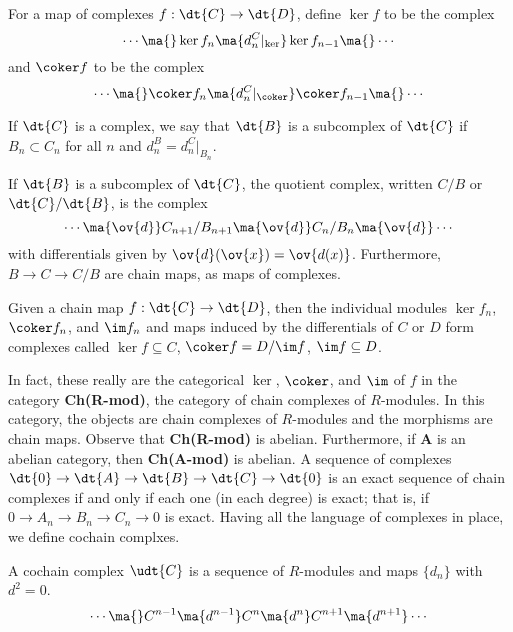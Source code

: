 \begin{dfn}
For a map of complexes $f: \dt{C} \to \dt{D}$, define $\ker f$ to be the complex
	\[
	\cdots \ma{} \ker f_n \ma{d_n^C |_{\ker}} \ker f_{n-1} \ma{} \cdots
	\]
and $\coker f$ to be the complex
	\[
	\cdots \ma{} \coker f_n \ma{d_n^C |_{\coker}} \coker f_{n-1} \ma{} \cdots
	\]
\end{dfn}


\begin{dfn}[Subcomplex]
If $\dt{C}$ is a complex, we say that $\dt{B}$ is a subcomplex of $\dt{C}$ if $B_n \subset C_n$ for all $n$ and $d_n^B=d_n^C |_{B_n}$.
\end{dfn}


\begin{dfn}
If $\dt{B}$ is a subcomplex of $\dt{C}$, the quotient complex, written $C/B$ or $\dt{C}/\dt{B}$, is the complex
	\[
	\cdots \ma{\ov{d}} C_{n+1}/B_{n+1} \ma{\ov{d}} C_n/B_n \ma{\ov{d}} \cdots
	\] 
with differentials given by $\ov{d}(\ov{x})=\ov{d(x)}$. Furthermore, $B \to C \to C/B$ are chain maps, as maps of complexes. 
\end{dfn}


\begin{dfn}
Given a chain map $f: \dt{C} \to \dt{D}$, then the individual modules $\ker f_n$, $\coker f_n$, and $\im f_n$ and maps induced by the differentials of $C$ or $D$ form complexes called $\ker f \subseteq C$, $\coker f=D/\im f$, $\im f \subseteq D$. 
\end{dfn}


In fact, these really are the categorical $\ker$, $\coker$, and $\im$ of $f$ in the category \textbf{Ch(R-mod)}, the category of chain complexes of $R$-modules. In this category, the objects are chain complexes of $R$-modules and the morphisms are chain maps. Observe that \textbf{Ch(R-mod)} is abelian. Furthermore, if \textbf{A} is an abelian category, then \textbf{Ch(A-mod)} is abelian. A sequence of complexes $\dt{0} \to \dt{A} \to \dt{B} \to \dt{C} \to \dt{0}$ is an exact sequence of chain complexes if and only if each one (in each degree) is exact; that is, if $0 \to A_n \to B_n \to C_n \to 0$ is exact. Having all the language of complexes in place, we define cochain complxes. 


\begin{dfn}
A cochain complex $\udt{C}$ is a sequence of $R$-modules and maps $\{d_n\}$ with $d^2=0$.
	\[
	\cdots \ma{} C^{n-1} \ma{d^{n-1}} C^n \ma{d^n} C^{n+1} \ma{d^{n+1}} \cdots
	\]
\end{dfn}


